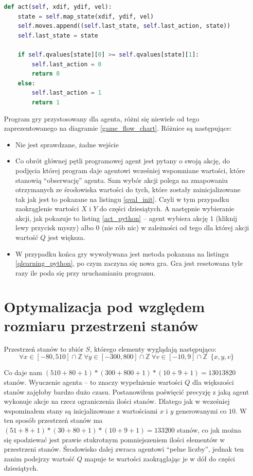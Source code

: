 \documentclass[a4paper, 12pt,oneside]{book}
\begin{document}
\begin{lstlisting}[language=Python, label={act_python},
caption={Metoda wybierająca akcję agenta}]
def act(self, xdif, ydif, vel):
    state = self.map_state(xdif, ydif, vel)
    self.moves.append((self.last_state, self.last_action, state))
    self.last_state = state

    if self.qvalues[state][0] >= self.qvalues[state][1]:
        self.last_action = 0
        return 0
    else:
        self.last_action = 1
        return 1
\end{lstlisting}
Program gry przystosowany dla agenta, różni się niewiele od tego
zaprezentowanego na diagramie \ref{game_flow_chart}. Różnice są następujące:
\begin{itemize}
\setlength\itemsep{-0.4em}
\item Nie jest sprawdzane, żadne wejście
\item Co obrót głównej pętli programowej agent jest pytany o swoją akcję, do
	podjęcia której program daje agentowi wcześniej wspomniane wartości,
	które stanowią ``obserwację'' agenta. Sam wybór akcji polega na
	zmapowaniu otrzymanych ze środowiska wartości do tych, które zostały
	zainicjalizowane tak jak jest to pokazane na listingu \ref{qval_init}.
	Czyli w tym przypadku zaokrąglenie wartości $X$ i $Y$ do części
	dziesiątych. A następnie wybieranie akcji, jak pokazuje to
	listing \ref{act_python} -- agent wybiera akcję $1$ (kliknij lewy
	przycisk myszy) albo $0$ (nie rób nic) w zależności od tego dla której
	akcji wartość $Q$ jest większa.
\item W przypadku końca gry wywoływana jest metoda pokazana na listingu
	\ref{qlearning_python},  po czym zaczyna się nowa gra. Gra jest
	resetowana tyle razy ile poda się przy uruchamianiu programu.
\end{itemize}

\section{Optymalizacja pod względem rozmiaru przestrzeni stanów}
Przestrzeń stanów to zbiór $S$, którego elementy wyglądają następująco:
\[\forall x \in [-80, 510] \cap \mathbb{Z} \ \forall y \in [-300,800] \cap
\mathbb{Z} \ \forall v \in [-10,9] \cap \mathbb{Z}\ \  \{x, y, v\}\]

Co daje nam $(510 + 80 + 1) * (300 + 800 + 1) * (10 + 9 +1) = 13 013 820$
stanów. Wyuczenie agenta -- to znaczy wypełnienie wartości $Q$ dla większości
stanów zajęłoby bardzo dużo czasu. Postanowiłem poświęcić precyzję z jaką agent
wykonuje akcje na rzecz ograniczenia ilości stanów. Dlatego jak w wcześniej
wspominałem stany są inicjalizowane z wartościami $x$ i $y$ generowanymi co
$10$. W ten sposób przestrzeń stanów ma $(51 + 8 + 1) * (30 + 80 + 1) * (10 + 9
+ 1) = 133 200$ stanów, co jak można się spodziewać jest prawie stukrotnym
pomniejszeniem ilości elementów w przestrzeni stanów. Środowisko dalej zwraca
agentowi ``pełne liczby'', jednak ten zanim podejrzy wartość $Q$ mapuje te
wartości zaokrąglając je w dół do części dziesiątych.
\end{document}
